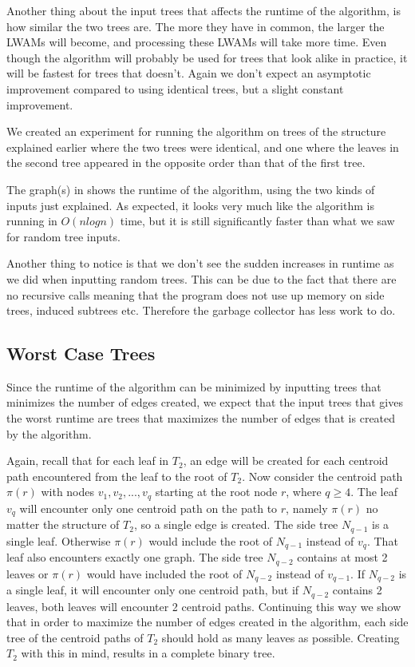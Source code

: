 Another thing about the input trees that affects the runtime of the algorithm, is how similar the two trees are. The more they have in common, the larger the LWAMs will become, and processing these LWAMs will take more time. Even though the algorithm will probably be used for trees that look alike in practice, it will be fastest for trees that doesn't. Again we don't expect an asymptotic improvement compared to using identical trees, but a slight constant improvement.

We created an experiment for running the algorithm on trees of the structure explained earlier where the two trees were identical, and one where the leaves in the second tree appeared in the opposite order than that of the first tree.

The graph(s) in  shows the runtime of the algorithm, using the two kinds of inputs just explained. As expected, it looks very much like the algorithm is running in $O(nlogn)$ time, but it is still significantly faster than what we saw for random tree inputs. 

Another thing to notice is that we don't see the sudden increases in runtime as we did when inputting random trees. This can be due to the fact that there are no recursive calls meaning that the program does not use up memory on side trees, induced subtrees etc. Therefore the garbage collector has less work to do.


\subsection{Worst Case Trees}
Since the runtime of the algorithm can be minimized by inputting trees that minimizes the number of edges created, we expect that the input trees that gives the worst runtime are trees that maximizes the number of edges that is created by the algorithm.

Again, recall that for each leaf in $T_2$, an edge will be created for each centroid path encountered from the leaf to the root of $T_2$. Now consider the centroid path $\pi(r)$ with nodes $v_1, v_2, ..., v_q$ starting at the root node $r$, where $q \ge 4$. The leaf $v_q$ will encounter only one centroid path on the path to $r$, namely $\pi(r)$ no matter the structure of $T_2$, so a single edge is created. The side tree $N_{q-1}$ is a single leaf. Otherwise $\pi(r)$ would include the root of $N_{q-1}$ instead of $v_q$. That leaf also encounters exactly one graph. The side tree $N_{q-2}$ contains at most 2 leaves or $\pi(r)$ would have included the root of $N_{q-2}$ instead of $v_{q-1}$. If $N_{q-2}$ is a single leaf, it will encounter only one centroid path, but if $N_{q-2}$ contains 2 leaves, both leaves will encounter 2 centroid paths. Continuing this way we show that in order to maximize the number of edges created in the algorithm, each side tree of the centroid paths of $T_2$ should hold as many leaves as possible. Creating $T_2$ with this in mind, results in a complete binary tree.

